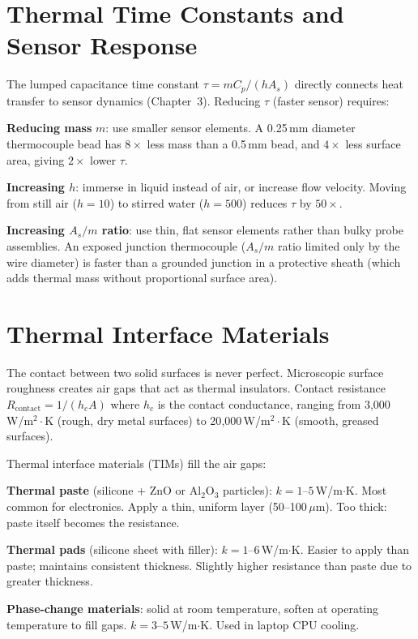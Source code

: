 \documentclass[11pt,letterpaper,twoside,openany]{book}
\begin{document}
\section{Thermal Time Constants and Sensor Response}
The lumped capacitance time constant $\tau = mC_p/(hA_s)$ directly connects heat transfer to sensor dynamics (Chapter~3). Reducing $\tau$ (faster sensor) requires:

\textbf{Reducing mass} $m$: use smaller sensor elements. A 0.25\,mm diameter thermocouple bead has $8\times$ less mass than a 0.5\,mm bead, and $4\times$ less surface area, giving $2\times$ lower $\tau$.

\textbf{Increasing $h$}: immerse in liquid instead of air, or increase flow velocity. Moving from still air ($h = 10$) to stirred water ($h = 500$) reduces $\tau$ by $50\times$.

\textbf{Increasing $A_s/m$ ratio}: use thin, flat sensor elements rather than bulky probe assemblies. An exposed junction thermocouple ($A_s/m$ ratio limited only by the wire diameter) is faster than a grounded junction in a protective sheath (which adds thermal mass without proportional surface area).

\section{Thermal Interface Materials}
The contact between two solid surfaces is never perfect. Microscopic surface roughness creates air gaps that act as thermal insulators. Contact resistance $R_{\text{contact}} = 1/(h_c A)$ where $h_c$ is the contact conductance, ranging from 3{,}000\,W/m$^2\cdot$K (rough, dry metal surfaces) to 20{,}000\,W/m$^2\cdot$K (smooth, greased surfaces).

Thermal interface materials (TIMs) fill the air gaps:

\textbf{Thermal paste} (silicone + ZnO or Al$_2$O$_3$ particles): $k = 1$--$5$\,W/m$\cdot$K. Most common for electronics. Apply a thin, uniform layer (50--100\,$\mu$m). Too thick: paste itself becomes the resistance.

\textbf{Thermal pads} (silicone sheet with filler): $k = 1$--$6$\,W/m$\cdot$K. Easier to apply than paste; maintains consistent thickness. Slightly higher resistance than paste due to greater thickness.

\textbf{Phase-change materials}: solid at room temperature, soften at operating temperature to fill gaps. $k = 3$--$5$\,W/m$\cdot$K. Used in laptop CPU cooling.
\end{document}
